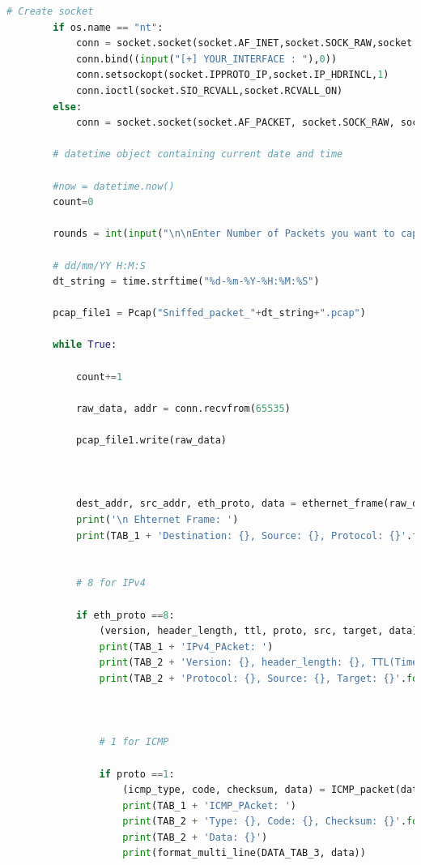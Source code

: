 \documentclass[12pt, a4paper]{report}
\begin{document}
\begin{lstlisting}[language=Python, style=chstyle]
        # Create socket 
        if os.name == "nt":
            conn = socket.socket(socket.AF_INET,socket.SOCK_RAW,socket.IPPROTO_IP)
            conn.bind((input("[+] YOUR_INTERFACE : "),0))
            conn.setsockopt(socket.IPPROTO_IP,socket.IP_HDRINCL,1)
            conn.ioctl(socket.SIO_RCVALL,socket.RCVALL_ON)
        else:
            conn = socket.socket(socket.AF_PACKET, socket.SOCK_RAW, socket.ntohs(0x0800))

        # datetime object containing current date and time

        #now = datetime.now()
        count=0

        rounds = int(input("\n\nEnter Number of Packets you want to capture: "))

        # dd/mm/YY H:M:S
        dt_string = time.strftime("%d-%m-%Y-%H:%M:%S")

        pcap_file1 = Pcap("Sniffed_packet_"+dt_string+".pcap")

        while True:
            
            count+=1

            raw_data, addr = conn.recvfrom(65535)
            
            pcap_file1.write(raw_data)



            dest_addr, src_addr, eth_proto, data = ethernet_frame(raw_data)
            print('\n Ehternet Frame: ')
            print(TAB_1 + 'Destination: {}, Source: {}, Protocol: {}'.format(dest_addr, src_addr, eth_proto))

 
            # 8 for IPv4

            if eth_proto ==8:
                (version, header_length, ttl, proto, src, target, data) = ipv4_packet(data)
                print(TAB_1 + 'IPv4_PAcket: ')
                print(TAB_2 + 'Version: {}, header_length: {}, TTL(Time to Live): {}'.format(version, header_length, ttl))
                print(TAB_2 + 'Protocol: {}, Source: {}, Target: {}'.format(proto, src, target))

             

                # 1 for ICMP

                if proto ==1:
                    (icmp_type, code, checksum, data) = ICMP_packet(data)
                    print(TAB_1 + 'ICMP_PAcket: ')
                    print(TAB_2 + 'Type: {}, Code: {}, Checksum: {}'.format(icmp_type, code, checksum))
                    print(TAB_2 + 'Data: {}')
                    print(format_multi_line(DATA_TAB_3, data))


\end{lstlisting}
\end{document}
